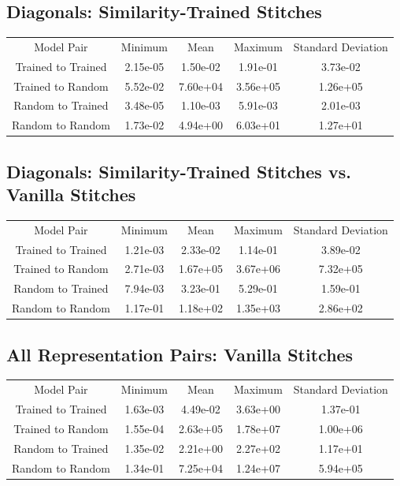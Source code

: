 \documentclass{article} %
\begin{document}
\label{Table2}
\subsection*{Diagonals: Similarity-Trained Stitches}
\begin{tabular}{c c c c c}
   Model Pair&Minimum&Mean&Maximum&Standard Deviation\\
   Trained to Trained&2.15e-05&1.50e-02&1.91e-01&3.73e-02\\
   Trained to Random&5.52e-02&7.60e+04&3.56e+05&1.26e+05\\
   Random to Trained&3.48e-05&1.10e-03&5.91e-03&2.01e-03\\
   Random to Random&1.73e-02&4.94e+00&6.03e+01&1.27e+01\\
\end{tabular}

\label{Table3}
\subsection*{Diagonals: Similarity-Trained Stitches vs. Vanilla Stitches}
\begin{tabular}{c c c c c}
   Model Pair&Minimum&Mean&Maximum&Standard Deviation\\
   Trained to Trained&1.21e-03&2.33e-02&1.14e-01&3.89e-02\\
   Trained to Random&2.71e-03&1.67e+05&3.67e+06&7.32e+05\\
   Random to Trained&7.94e-03&3.23e-01&5.29e-01&1.59e-01\\
   Random to Random&1.17e-01&1.18e+02&1.35e+03&2.86e+02\\
\end{tabular}

\label{Table4}
\subsection*{All Representation Pairs: Vanilla Stitches}
\begin{tabular}{c c c c c}
   Model Pair&Minimum&Mean&Maximum&Standard Deviation\\
   Trained to Trained&1.63e-03&4.49e-02&3.63e+00&1.37e-01\\
   Trained to Random&1.55e-04&2.63e+05&1.78e+07&1.00e+06\\
   Random to Trained&1.35e-02&2.21e+00&2.27e+02&1.17e+01\\
   Random to Random&1.34e-01&7.25e+04&1.24e+07&5.94e+05\\
\end{tabular}
\end{document}
